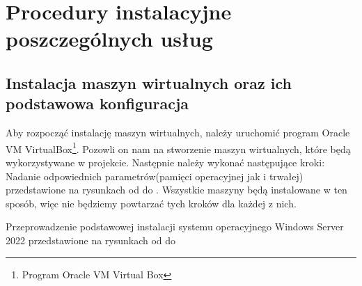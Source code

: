 	\newpage
\section{Procedury instalacyjne poszczególnych usług}		%


\subsection{Instalacja maszyn wirtualnych oraz ich podstawowa konfiguracja}	

Aby rozpocząć instalację maszyn wirtualnych, należy uruchomić program Oracle VM VirtualBox\footnote{Program Oracle VM Virtual Box\cite{VirtualBox}}. Pozowli on nam na stworzenie maszyn wirtualnych, które będą wykorzystywane w projekcie. Następnie należy wykonać następujące kroki:\\

Nadanie odpowiednich parametrów(pamięci operacyjnej jak i trwałej) przedstawione na rysunkach od  do . Wszystkie maszyny będą instalowane w ten sposób, więc nie będziemy powtarzać tych kroków dla każdej z nich.
\clearpage

\clearpage

\clearpage

Przeprowadzenie podstawowej instalacji systemu operacyjnego Windows Server 2022 przedstawione na rysunkach od  do 

\clearpage

\clearpage

\clearpage

\clearpage
